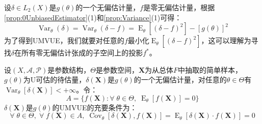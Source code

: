 \begin{note}
	设$\delta\in L_2(X)$是$g(\theta)$的一个无偏估计量，$f$是零无偏估计量，根据\cref{prop:0UnbiasedEstimator}(1)和\cref{prop:Variance}(1)可得：
	\begin{equation*}
		\operatorname{Var}_{\theta}(\delta)=\operatorname{Var}_{\theta}(\delta-f)=\operatorname{E}_{\theta}[(\delta-f)^2]-[g(\theta)]^2
	\end{equation*}
	为了得到UMVUE，我们就要对任意的$f$最小化$\operatorname{E}_{\theta}[(\delta-f)^2]$，这可以理解为寻找$\delta$在所有零无偏估计张成的子空间上的投影$f^*$。
\end{note}
\begin{theorem}\label{theo:UMVUE0UnbiasedEstimation}
	设$(X,\mathscr{A},\mathscr{P})$是参数结构，$\Theta$是参数空间，$\mathbf{X}$为从总体$F$中抽取的简单样本，$g(\theta)$为U可估的待估量，$\delta(\mathbf{X})$是$g(\theta)$的一个无偏估计量，对任意的$\theta\in\Theta$有$\operatorname{Var}_{\theta}[\delta(\mathbf{X})]<+\infty$。令：
	\begin{equation*}
		A=\{f(\mathbf{X}):\forall\;\theta\in\Theta,\;\operatorname{E}_{\theta}[f(\mathbf{X})]=0\}
	\end{equation*}
	$\delta(\mathbf{X})$是$g(\theta)$的UMVUE的充要条件为：
	\begin{equation*}
		\forall\;\theta\in\Theta,\;\forall\;f(\mathbf{X})\in A,\;\operatorname{Cov}_{\theta}[\delta(\mathbf{X}),f(\mathbf{X})]=\operatorname{E}_{\theta}[\delta(\mathbf{X})\cdot f(\mathbf{X})]=0
	\end{equation*}
\end{theorem}
